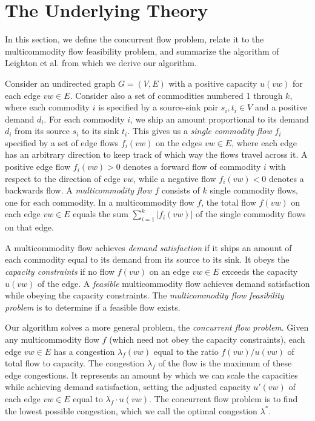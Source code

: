 \section{The Underlying Theory}
\label{sec:theory}

In this section, we define the concurrent flow problem, 
relate it to the multicommodity flow feasibility problem,
and summarize the algorithm of Leighton et al. 
from which we derive our algorithm.

Consider an undirected graph $G=(V,E)$ with a positive capacity $u(vw)$ for
each edge $vw \in E$.
Consider also a set of commodities numbered 1 through $k$, 
where each commodity $i$ is specified by a source-sink pair $s_i, t_i \in V$ 
and a positive demand $d_i$.
For each commodity $i$, we ship an amount proportional to its demand
$d_i$ from its source $s_i$ to its sink $t_i$.
This gives us a {\em single commodity flow} $f_i$ specified by
a set of edge flows $f_i(vw)$ on the edges $vw \in E$,
where each edge has an arbitrary direction to keep track of
which way the flows travel across it.
A positive edge flow $f _i(vw) > 0$ denotes a forward flow of commodity $i$
with respect to the direction of edge $vw$, 
while a negative flow $f _i(vw) < 0$ denotes a backwards flow.
A {\em multicommodity flow} $f$ consists of $k$ single commodity flows, 
one for each commodity.
In a multicommodity flow $f$, the total flow $f(vw)$ on each edge $vw \in E$
equals the sum $\sum _{i=1}^k |f_i(vw)|$ of the single commodity flows
on that edge.

A multicommodity flow achieves {\em demand satisfaction} 
if it ships an amount of each commodity equal to its demand 
from its source to its sink.
It obeys the {\em capacity constraints}
if no flow $f(vw)$ on an edge $vw \in E$ exceeds the capacity $u(vw)$ 
of the edge.
A {\em feasible} multicommodity flow achieves demand satisfaction 
while obeying the capacity constraints.
The {\em multicommodity flow feasibility problem} is to determine if a
feasible flow exists.

Our algorithm solves a more general problem, the {\em concurrent flow
problem}.  Given any multicommodity flow $f$ (which need not obey the
capacity constraints), each edge $vw \in E$ has a
congestion $\lambda _f (vw)$ equal to the ratio $f(vw) / u(vw)$ of 
total flow to capacity.
The congestion $\lambda_f$ of the flow is the maximum of these 
edge congestions.
It represents an amount by which we can scale the
capacities while achieving demand satisfaction, setting the adjusted
capacity $u'(vw)$ of each edge $vw \in E$ equal to $\lambda _f \cdot u(vw)$.
The concurrent flow problem is to find the lowest possible congestion, 
which we call the optimal congestion $\lambda ^*$.

